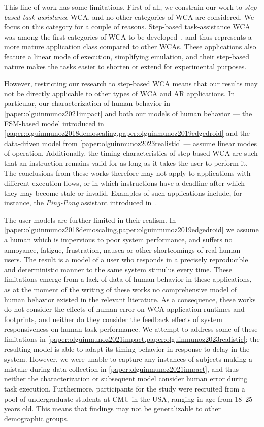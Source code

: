 \medskip

This line of work has some limitations.
First of all, we constrain our work to \emph{step-based task-assistance} \gls{WCA}, and no other categories of \gls{WCA} are considered.
We focus on this category for a couple of reasons.
Step-based task-assistance \gls{WCA} was among the first categories of \gls{WCA} to be developed~\cite{chen2015early}, and thus represents a more mature application class compared to other \glspl{WCA}.
These applications also feature a linear mode of execution, simplifying emulation, and their step-based nature makes the tasks easier to shorten or extend for experimental purposes.

However, restricting our research to step-based \gls{WCA} means that our results may not be directly applicable to other types of \gls{WCA} and \gls{AR} applications.
In particular, our characterization of human behavior in \cref{paper:olguinmunoz2021impact} and both our models of human behavior --- the \gls{FSM}-based model introduced in \cref{paper:olguinmunoz2018demoscaling,paper:olguinmunoz2019edgedroid} and the data-driven model from \cref{paper:olguinmunoz2023realistic} --- assume linear modes of operation.
Additionally, the timing characteristics of step-based \gls{WCA} are such that an instruction remains valid for as long as it takes the user to perform it.
The conclusions from these works therefore may not apply to applications with different execution flows, or in which instructions have a deadline after which they may become stale or invalid.
Examples of such applications include, for instance, the \emph{Ping-Pong} assistant introduced in~\cite{chen2015early}.

The user models are further limited in their realism.
In \cref{paper:olguinmunoz2018demoscaling,paper:olguinmunoz2019edgedroid} we assume a human which is impervious to poor system performance, and suffers no annoyance, fatigue, frustration, nausea or other shortcomings of real human users.
The result is a model of a user who responds in a precisely reproducible and deterministic manner to the same system stimulus every time.
These limitations emerge from a lack of data of human behavior in these applications, as at the moment of the writing of these works no comprehensive model of human behavior existed in the relevant literature.
As a consequence, these works do not consider the effects of human error on \gls{WCA} application runtimes and footprints, and neither do they consider the feedback effects of system responsiveness on human task performance.
We attempt to address some of these limitations in \cref{paper:olguinmunoz2021impact,paper:olguinmunoz2023realistic};
the resulting model is able to adapt its timing behavior in response to delay in the system.
However, we were unable to capture any instances of subjects making a mistake during data collection in \cref{paper:olguinmunoz2021impact}, and thus neither the characterization or subsequent model consider human error during task execution.
Furthermore, participants for the study were recruited from a pool of undergraduate students at \gls{CMU} in the \gls{USA}, ranging in age from \numrange{18}{25} years old.
This means that findings may not be generalizable to other demographic groups.

